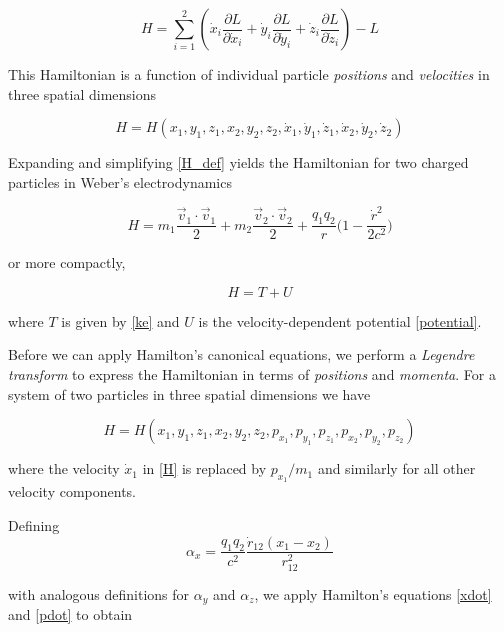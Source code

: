 \documentclass[12pt,a4paper]{article}
\theoremstyle{definition}
\theoremstyle{remark}
\newcommand{\qq}{q_1 q_2}
\newcommand{\rdot}{\dot{r}}
\begin{document}
\begin{equation}\label{H_def}
    H = \sum_{i=1}^{2} \left(\dot{x}_i \frac{\partial L}{\partial \dot{x}_i} + \dot{y}_i \frac{\partial L}{\partial \dot{y}_i} + \dot{z}_i \frac{\partial L}{\partial \dot{z}_i}\right) - L
\end{equation}

This Hamiltonian is a function of individual particle \textit{positions} and \textit{velocities} in three spatial dimensions

\begin{equation}
    H = H(x_1, y_1, z_1, x_2, y_2, z_2, \dot{x}_1, \dot{y}_1, \dot{z}_1, \dot{x}_2, \dot{y}_2, \dot{z}_2)
\end{equation}

Expanding and simplifying \eqref{H_def} yields the Hamiltonian for two charged particles in Weber's electrodynamics

\begin{equation}\label{H}
    H = m_1 \frac{\vec{v}_1 \cdot \vec{v}_1}{2} + m_2 \frac{\vec{v}_2 \cdot \vec{v}_2}{2} + \frac{\qq}{r}\bigg(1 - \frac{\rdot^2}{2c^2}\bigg)
\end{equation}

or more compactly,

\begin{equation}\label{h_box}
    \boxed{H = T + U}
\end{equation}

where $T$ is given by \eqref{ke} and $U$ is the velocity-dependent potential \eqref{potential}.

Before we can apply Hamilton's canonical equations, we perform a \textit{Legendre transform} to express the Hamiltonian in terms of \textit{positions} and \textit{momenta}. For a system of two particles in three spatial dimensions we have

\begin{equation}
    H = H(x_1, y_1, z_1, x_2, y_2, z_2, p_{x_1}, p_{y_1}, p_{z_1}, p_{x_2}, p_{y_2}, p_{z_2})
\end{equation}

where the velocity $\dot{x}_1$ in \eqref{H} is replaced by $p_{x_1}/m_1$ and similarly for all other velocity components.

Defining
\begin{equation}\label{alpha_x}
    \alpha_x = \frac{q_1 q_2}{c^2} \frac{\dot{r}_{12} (x_1 - x_2)}{r_{12}^2}
\end{equation}

with analogous definitions for $\alpha_y$ and $\alpha_z$, we apply Hamilton's equations \eqref{xdot} and \eqref{pdot} to obtain
\end{document}
